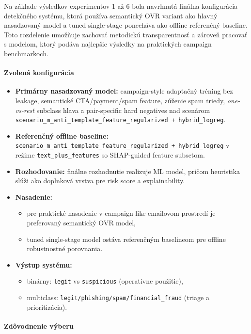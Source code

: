 \documentclass[conference]{IEEEtran}
\begin{document}
Na základe výsledkov experimentov 1 až 6 bola navrhnutá finálna konfigurácia
detekčného systému, ktorá používa semantický OVR variant ako hlavný
nasadzovaný model a tuned single-stage ponecháva ako offline referenčný
baseline. Toto rozdelenie umožňuje zachovať metodickú transparentnosť a
zároveň pracovať s modelom, ktorý podáva najlepšie výsledky na praktických
campaign benchmarkoch.

\paragraph{Zvolená konfigurácia}

\begin{itemize}
    \item \textbf{Primárny nasadzovaný model:} campaign-style adaptačný tréning bez leakage, semantické CTA/payment/spam feature, zúženie spam triedy, \textit{one-vs-rest} subclass hlava a pair-specific hard negatives nad scenárom \texttt{scenario\_m\_anti\_template\_feature\_regularized + hybrid\_logreg}.
    \item \textbf{Referenčný offline baseline:} \texttt{scenario\_m\_anti\_template\_feature\_regularized + hybrid\_logreg} v režime \texttt{text\_plus\_features} so SHAP-guided feature subsetom.
    \item \textbf{Rozhodovanie:} finálne rozhodnutie realizuje ML model, pričom heuristika slúži ako doplnková vrstva pre risk score a explainability.
    \item \textbf{Nasadenie:}
    \begin{itemize}
        \item pre praktické nasadenie v campaign-like emailovom prostredí je preferovaný semantický OVR model,
        \item tuned single-stage model ostáva referenčným baselineom pre offline robustnostné porovnania.
    \end{itemize}
    \item \textbf{Výstup systému:}
    \begin{itemize}
        \item binárny: \texttt{legit} vs \texttt{suspicious} (operatívne použitie),
        \item multiclass: \texttt{legit/phishing/spam/financial\_fraud} (triage a prioritizácia).
    \end{itemize}
\end{itemize}

\paragraph{Zdôvodnenie výberu}
\end{document}
